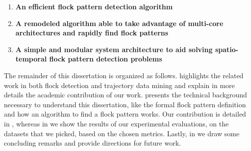 \begin{enumerate}
    \item \textbf{An efficient flock pattern detection algorithm}
    \item \textbf{A remodeled algorithm able to take advantage of multi-core architectures and rapidly find flock
        patterns}
    \item \textbf{A simple and modular system architecture to aid solving spatio-temporal flock pattern detection problems}
\end{enumerate}

The remainder of this dissertation is organized as follows.  highlights the related work in
both flock detection and trajectory data mining and explain in more details the academic contribution of our work.
 presents the technical background necessary to understand this dissertation, like the
formal flock pattern definition and how an algorithm to find a flock pattern works. Our contribution is detailed in
, whereas in  we show the results of our experimental evaluations, on the
datasets that we picked, based on the chosen metrics. Lastly, in  we draw some concluding
remarks and provide directions for future work.
